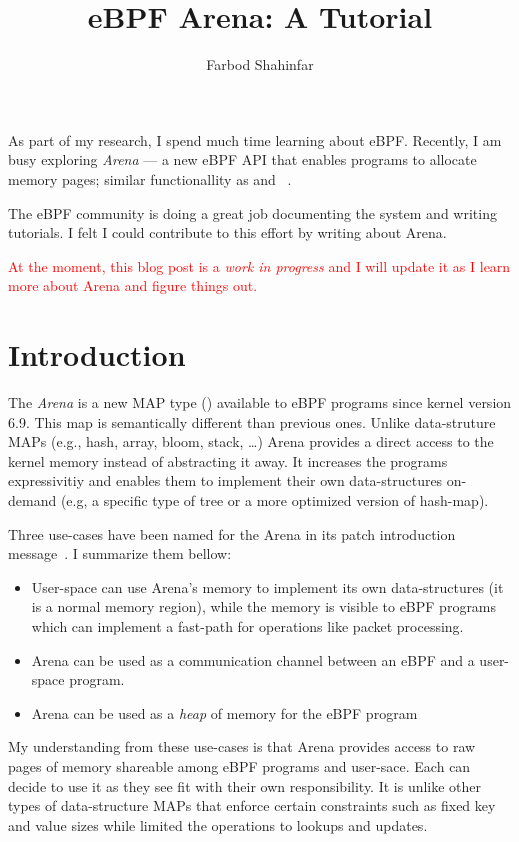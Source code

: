 \documentclass{article}
\title{eBPF Arena: A Tutorial}
\author{Farbod Shahinfar}
\begin{document}
\maketitle



As part of my research, I spend much time learning about eBPF.
Recently, I am busy exploring \emph{Arena} --- a new eBPF API that enables
programs to allocate memory pages; similar functionallity as  and
~\cite{arenapatch}.

The eBPF community is doing a great job documenting the system and writing
tutorials. I felt I could contribute to this effort by writing about Arena.

{
    \textcolor{red}{At the moment, this blog post is a \emph{work in
    progress} and I will update it as I learn more about Arena and figure
    things out.}
}

\section{Introduction}

The \emph{Arena} is a new MAP type () available to eBPF programs
since kernel version 6.9.
This map is semantically different than previous ones.
Unlike data-struture MAPs (e.g., hash, array, bloom, stack, \dots{}) Arena
provides a direct access to the kernel memory instead of abstracting it away.
It increases the programs expressivitiy and enables them to implement their own
data-structures on-demand (e.g, a specific type of tree or a more optimized
version of hash-map).

Three use-cases have been named for the Arena in its patch introduction
message~\cite{arenapatch}. I summarize them bellow:
\begin{itemize}
    \item User-space can use Arena's memory to implement its own
        data-structures (it is a normal memory region), while the memory is
        visible to eBPF programs which can implement a fast-path for operations
        like packet processing.
    \item Arena can be used as a communication channel between an eBPF and a
        user-space program.
    \item Arena can be used as a \emph{heap} of memory for the eBPF program
\end{itemize}
My understanding from these use-cases is that Arena provides access to raw
pages of memory shareable among eBPF programs and user-sace. Each can decide to
use it as they see fit with their own responsibility. It is unlike other types
of data-structure MAPs that enforce certain constraints such as fixed key and
value sizes while limited the operations to lookups and updates.
\end{document}

